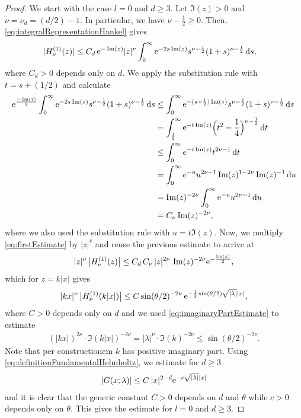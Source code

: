 \begin{proof}
  We start with the case $l = 0$ and $d \geq 3$.
  Let $\Im(z) > 0$ and $\nu = \nu_d = (d/2) - 1$.
  In particular, we have $\nu - \frac{1}{2} \geq 0$.
  Then, \eqref{eq:integralRepresentationHankel} gives
  \begin{align}
    \label{eq:firstEstimate}
    |H_\nu^{(1)}(z)|
    &\leq C_d \, \mathrm{e}^{-\operatorname{Im}(z)} |z|^\nu \int_0^\infty \mathrm{e}^{-2s \operatorname{Im}(z)} s^{\nu - \frac{1}{2}} (1 + s)^{\nu - \frac{1}{2}} \, {\operatorname{d}\!{s}},
  \end{align}
  where $C_d > 0$ depends only on $d$.
  We apply the substitution rule with $t = s + (1/2)$ and calculate
  \begin{align*}
    \mathrm{e}^{\frac{-\operatorname{Im}(z)}{2}} \int_0^\infty \mathrm{e}^{-2s \operatorname{Im}(z)} s^{\nu - \frac{1}{2}} ( 1 + s )^{\nu - \frac{1}{2}} \, {\operatorname{d}\!{s}}
    &\leq \int_0^\infty \mathrm{e}^{- (s + \frac{1}{2}) \operatorname{Im}(z)} s^{\nu - \frac{1}{2}} ( 1 + s )^{\nu - \frac{1}{2}} \, {\operatorname{d}\!{s}} \\
    &= \int_{\frac{1}{2}}^\infty \mathrm{e}^{-t \operatorname{Im}(z) } \Big(t^2 - \frac{1}{4} \Big) ^{\nu - \frac{1}{2}} \, {\operatorname{d}\!{t}} \\
    &\leq \int_0^\infty e^{-t \operatorname{Im}(z)} t^{2\nu - 1} \, {\operatorname{d}\!{t}} \\
    &= \int_0^\infty e^{-u}  u^{2 \nu - 1} \operatorname{Im}(z)^{1 - 2\nu} \operatorname{Im}(z)^{-1} \, {\operatorname{d}\!{u}} \\
    &= \operatorname{Im}(z)^{-2 \nu} \int_0^\infty \mathrm{e}^{-u} u^{2 \nu - 1} \, {\operatorname{d}\!{u}} \\
    &= C_\nu \operatorname{Im}(z)^{-2 \nu},
  \end{align*}
  where we also used the substitution rule with $u = t \Im(z)$.
  Now, we multiply \eqref{eq:firstEstimate} by $|z|^{v}$ and reuse the previous estimate to arrive at
  \begin{align*}
    |z|^\nu\,  \big|H_\nu^{(1)}(z)\big| \leq C_d \, C_\nu\, |z|^{2 \nu} \, \operatorname{Im}(z)^{-2\nu} \mathrm{e}^{-\frac{\operatorname{Im}(z)}{2}},
  \end{align*}
  which for $z = k|x|$ gives
  \begin{align}
    \label{eq:zHEstimate}
    |kx|^\nu \, \big|H_\nu^{(1)}(k |x|)\big| \leq C \sin(\theta/2)^{-2\nu} \, \mathrm{e}^{-\frac{1}{2} \sin(\theta/2) \sqrt{|\lambda|} |x|},
  \end{align}
  where $C > 0$ depends only on $d$ and we used \eqref{eq:imaginaryPartEstimate} to estimate
  \begin{align*}
    (|kx|)^{2\nu} \cdot \Im(k|x|)^{-2\nu} 
    = |\lambda|^\nu \cdot \Im(k)^{-2\nu} 
    \leq \sin(\theta/2)^{-2\nu}.
  \end{align*}
  Note that per constructionem $k$ has positive imaginary part.
  Using \eqref{eq:definitionFundamentalHelmholtz}, we estimate for $d \geq 3$
  \begin{align*}
    |G(x; \lambda)| 
    \leq C\,  |x|^{2 - d} \mathrm{e}^{-c \sqrt{|\lambda|} |x|}
  \end{align*}
  and it is clear that the generic constant $C>0$ depends on $d$ and $\theta$ while $c > 0$ depends only on $\theta$.
  This gives the estimate for $l = 0$ and $d \geq 3$.


\end{proof}
